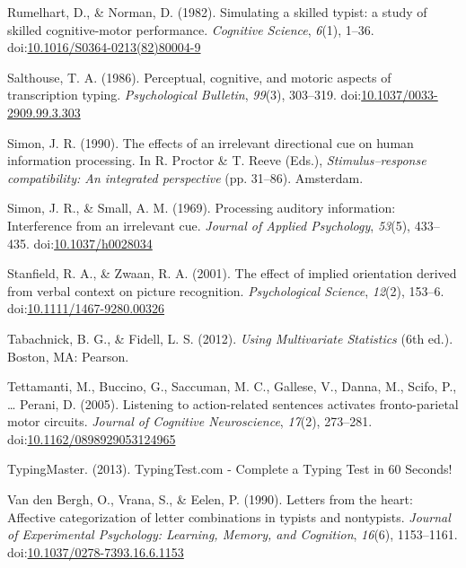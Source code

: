\documentclass[english,man]{apa6}
\theoremstyle{definition}
\theoremstyle{definition}
\theoremstyle{definition}
\theoremstyle{remark}
\begin{document}
\hypertarget{ref-Rumelhart1982}{}
Rumelhart, D., \& Norman, D. (1982). Simulating a skilled typist: a
study of skilled cognitive-motor performance. \emph{Cognitive Science},
\emph{6}(1), 1--36.
doi:\href{https://doi.org/10.1016/S0364-0213(82)80004-9}{10.1016/S0364-0213(82)80004-9}

\hypertarget{ref-Salthouse1986}{}
Salthouse, T. A. (1986). Perceptual, cognitive, and motoric aspects of
transcription typing. \emph{Psychological Bulletin}, \emph{99}(3),
303--319.
doi:\href{https://doi.org/10.1037/0033-2909.99.3.303}{10.1037/0033-2909.99.3.303}

\hypertarget{ref-Simon1990}{}
Simon, J. R. (1990). The effects of an irrelevant directional cue on
human information processing. In R. Proctor \& T. Reeve (Eds.),
\emph{Stimulus--response compatibility: An integrated perspective} (pp.
31--86). Amsterdam.

\hypertarget{ref-Simon1969}{}
Simon, J. R., \& Small, A. M. (1969). Processing auditory information:
Interference from an irrelevant cue. \emph{Journal of Applied
Psychology}, \emph{53}(5), 433--435.
doi:\href{https://doi.org/10.1037/h0028034}{10.1037/h0028034}

\hypertarget{ref-Stanfield2001}{}
Stanfield, R. A., \& Zwaan, R. A. (2001). The effect of implied
orientation derived from verbal context on picture recognition.
\emph{Psychological Science}, \emph{12}(2), 153--6.
doi:\href{https://doi.org/10.1111/1467-9280.00326}{10.1111/1467-9280.00326}

\hypertarget{ref-Tabachnick2012}{}
Tabachnick, B. G., \& Fidell, L. S. (2012). \emph{Using Multivariate
Statistics} (6th ed.). Boston, MA: Pearson.

\hypertarget{ref-Tettamanti2005}{}
Tettamanti, M., Buccino, G., Saccuman, M. C., Gallese, V., Danna, M.,
Scifo, P., \ldots{} Perani, D. (2005). Listening to action-related
sentences activates fronto-parietal motor circuits. \emph{Journal of
Cognitive Neuroscience}, \emph{17}(2), 273--281.
doi:\href{https://doi.org/10.1162/0898929053124965}{10.1162/0898929053124965}

\hypertarget{ref-Inc2013}{}
TypingMaster. (2013). TypingTest.com - Complete a Typing Test in 60
Seconds!

\hypertarget{ref-VandenBergh1990}{}
Van den Bergh, O., Vrana, S., \& Eelen, P. (1990). Letters from the
heart: Affective categorization of letter combinations in typists and
nontypists. \emph{Journal of Experimental Psychology: Learning, Memory,
and Cognition}, \emph{16}(6), 1153--1161.
doi:\href{https://doi.org/10.1037/0278-7393.16.6.1153}{10.1037/0278-7393.16.6.1153}
\end{document}
